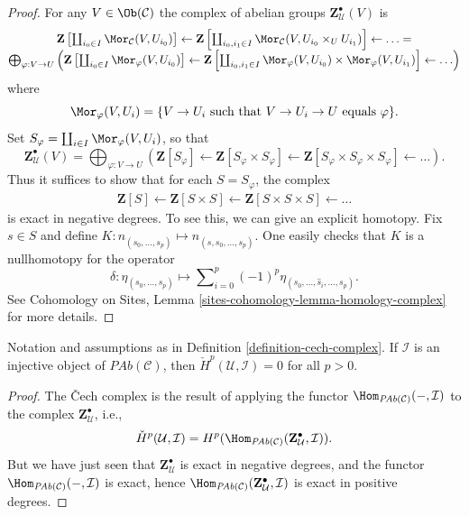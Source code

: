 \begin{proof}
For any $V\in \Ob(\mathcal{C})$ the complex of abelian groups
$\mathbf{Z}_\mathcal{U}^\bullet(V)$ is
$$
\begin{matrix}
\mathbf{Z}\left[
\coprod_{i_0\in I} \Mor_\mathcal{C}(V, U_{i_0})\right]
\leftarrow
\mathbf{Z}\left[
\coprod_{i_0, i_1 \in I}
\Mor_\mathcal{C}(V, U_{i_0} \times_U U_{i_1})\right]
\leftarrow \ldots = \\
\bigoplus_{\varphi : V \to U}
\left(
\mathbf{Z}\left[\coprod_{i_0 \in I} \Mor_\varphi(V, U_{i_0})\right]
\leftarrow
\mathbf{Z}\left[\coprod_{i_0, i_1\in I} \Mor_\varphi(V, U_{i_0}) \times
\Mor_\varphi(V, U_{i_1})\right]
\leftarrow
\ldots
\right)
\end{matrix}
$$
where
$$
\Mor_{\varphi}(V, U_i)
=
\{ V \to U_i \text{ such that } V \to U_i \to U \text{ equals } \varphi \}.
$$
Set $S_\varphi = \coprod_{i\in I} \Mor_\varphi(V, U_i)$, so that
$$
\mathbf{Z}_\mathcal{U}^\bullet(V)
=
\bigoplus_{\varphi : V \to U}
\left(
\mathbf{Z}[S_\varphi] \leftarrow
\mathbf{Z}[S_\varphi \times S_\varphi] \leftarrow
\mathbf{Z}[S_\varphi \times S_\varphi \times S_\varphi] \leftarrow
\ldots \right).
$$
Thus it suffices to show that for each $S = S_\varphi$, the complex
\begin{align*}
\mathbf{Z}[S] \leftarrow
\mathbf{Z}[S \times S] \leftarrow
\mathbf{Z}[S \times S \times S] \leftarrow \ldots
\end{align*}
is exact in negative degrees. To see this, we can give an explicit homotopy.
Fix $s\in S$ and define $K: n_{(s_0, \ldots, s_p)} \mapsto n_{(s, s_0,
\ldots, s_p)}.$ One easily checks that $K$ is a nullhomotopy for the operator
$$
\delta :
\eta_{(s_0, \ldots, s_p)}
\mapsto
\sum\nolimits_{i = 0}^p (-1)^p \eta_{(s_0, \ldots, \hat s_i, \ldots, s_p)}.
$$
See
Cohomology on Sites, Lemma \ref{sites-cohomology-lemma-homology-complex}
for more details.
\end{proof}

\begin{lemma}
\label{lemma-hom-injective}
Notation and assumptions as in Definition \ref{definition-cech-complex}.
If $\mathcal{I}$ is an injective object of $\textit{PAb}(\mathcal{C})$,
then $\check H^p(\mathcal{U}, \mathcal{I}) = 0$ for all $p > 0$.
\end{lemma}

\begin{proof}
The {\v C}ech complex is the result of applying the functor
$\Hom_{\textit{PAb}(\mathcal{C})}(-, \mathcal{I}) $ to the complex $
\mathbf{Z}^\bullet_\mathcal{U} $, i.e.,
$$
\check H^p(\mathcal{U}, \mathcal{I}) = H^p
(\Hom_{\textit{PAb}(\mathcal{C})} (\mathbf{Z}^\bullet_\mathcal{U},
\mathcal{I})).
$$
But we have just seen that $\mathbf{Z}^\bullet_\mathcal{U}$ is exact in
negative degrees, and the functor $\Hom_{\textit{PAb}(\mathcal{C})}(-,
\mathcal{I})$ is exact, hence $\Hom_{\textit{PAb}(\mathcal{C})}
(\mathbf{Z}^\bullet_\mathcal{U}, \mathcal{I})$ is exact in positive degrees.
\end{proof}

